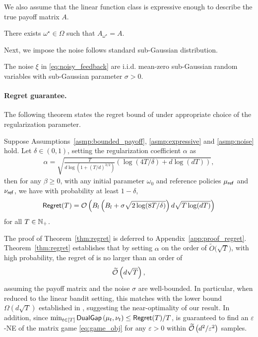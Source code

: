  

We also assume that the linear function class is expressive enough to describe the true payoff matrix $A$.
\begin{asmp}[realizability]\label{asmp:expressive}
    There exists $\omega^\star\in\Omega$ such that $A_{\omega^\star}=A$.
\end{asmp}

Next, we impose the noise follows standard sub-Gaussian distribution.
\begin{asmp}\label{asmp:noise}
    The noise $\xi$ in \eqref{eq:noisy_feedback} are i.i.d. mean-zero sub-Gaussian random variables with sub-Gaussian parameter $\sigma>0$.
\end{asmp}

\paragraph{Regret guarantee.} The following theorem states the regret bound of \name under appropriate choice of the regularization parameter.  
\begin{thm}\label{thm:regret}
    Suppose Assumptions~\ref{asmp:bounded_payoff}, \ref{asmp:expressive} and \ref{asmp:noise} hold. Let $\delta\in(0,1)$, setting the 
regularization coefficient $\alpha$ as
\begin{align}\label{eq:alpha}
\alpha=\sqrt{\frac{T}{d\log\left(1+(T/d)^{3/2}\right)} \left(\log(4T/\delta)+d\log (dT)\right)},
\end{align}
then for any $\beta\geq 0$, with any initial parameter $\omega_0$ and reference policies $\mu_{\mathsf{ref}}$ and $\nu_{\mathsf{ref}}$, we have with probability at least $1-\delta$,
    \begin{align}\label{eq:regret_bound}
  \mathsf{Regret}(T)={\mathcal{O}}\left(B_l\left(B_l+\sigma\sqrt{2\log(8T/\delta)}\right)d\sqrt{T  \log (dT )}\right)
    \end{align}
    for all $T\in {\mathbb N}_+$.
\end{thm}

The proof of Theorem~\ref{thm:regret} is deferred to Appendix~\ref{app:proof_regret}. Theorem~\ref{thm:regret} establishes that by setting $\alpha$ on the order of $\widetilde{O}\big(\sqrt{T}\big)$, with high probability, the regret of \name is no larger than an order of
$$\widetilde{{\mathcal{O}}}\left(d\sqrt{T}\right),$$
assuming the payoff matrix and the noise $\sigma$ are well-bounded.  In particular, when reduced to the linear bandit setting, this matches with the lower bound $\Omega(d\sqrt{T})$ established in  \citet{dani2008stochastic}, suggesting the near-optimality of our result. 
In addition, since $ \min_{t\in[T]}\mathsf{DualGap}\left(\mu_t,\nu_t\right)\leq \mathsf{Regret}(T) /T$, \name is guaranteed to find an $\varepsilon$-NE of the matrix game \eqref{eq:game_obj} for any $\varepsilon>0$ within $\widetilde{{\mathcal{O}}}\left( d^2 /\varepsilon^2 \right)$ samples.

  


